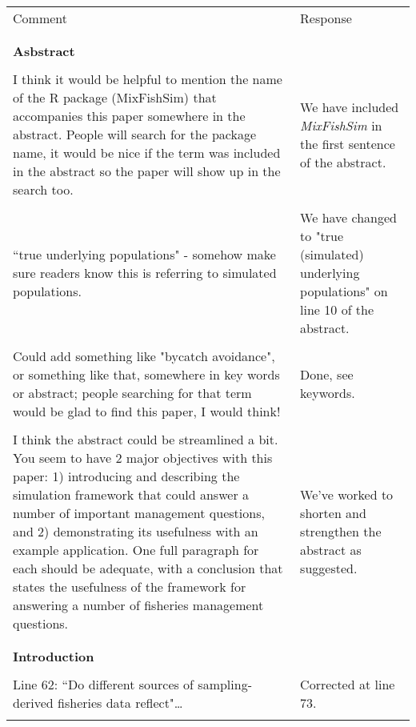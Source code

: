 \documentclass[10pt]{letter}
\begin{document}
	\begin{center}
	\begin{longtable}{p{8cm} | p{8cm}}
		\toprule
		Comment & Response \\
		\\
		\hline
		\\
\textbf{Asbstract} & \\
\\
I think it would be helpful to mention the name of the R package (MixFishSim)
that accompanies this paper somewhere in the abstract. People will search for
the package name, it would be nice if the term was included in the abstract so
the paper will show up in the search too. & We have included
\textit{MixFishSim} in the first sentence of the abstract. \\
\\
``true underlying populations" - somehow make sure readers know this is
referring to simulated populations. & We have changed to "true (simulated)
underlying populations" on line 10 of the abstract. \\
\\
Could add something like "bycatch avoidance", or something like that, somewhere
in key words or abstract; people searching for that term would be glad to find
this paper, I would think! & Done, see keywords. \\ 
\\
I think the abstract could be streamlined a bit. You seem to have 2 major
objectives with this paper: 1) introducing and describing the simulation
framework that could answer a number of important management questions, and 2)
demonstrating its usefulness with an example application. One full paragraph
for each should be adequate, with a conclusion that states the usefulness of
the framework for answering a number of fisheries management questions.  &
We've worked to shorten and strengthen the abstract as suggested. \\
\\
\hline
\\
\textbf{Introduction} &  \\
\\
Line 62: ``Do different sources of sampling-derived fisheries data reflect"… &
Corrected at line 73. \\
\\
		

\end{longtable}
\end{center}
\end{document}
